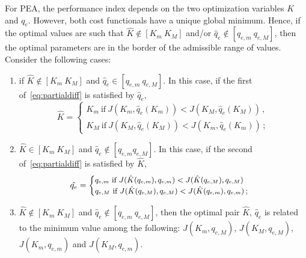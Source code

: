 For PEA, the performance index depends on the two optimization variables $K$ and $q_e$. However, both cost functionals have a unique global minimum. Hence, if the optimal values are such that $\hat{K} \notin [K_m\ K_M]$ and/or $\hat{q}_e \notin [q_{e,m}\ q_{e,M}]$, then the optimal parameters are in the border of the admissible range of values. Consider the following cases:
\begin{enumerate}
\item if $\hat{K} \notin [K_m\ K_M]$ and $\hat{q}_e \in [q_{e,m}\ q_{e,M}]$. In this case, if the first of~\eqref{eq:partialdiff} is satisfied by $\hat{q}_e$, 
\begin{equation*}
\hat{K} = 
\begin{cases} 
K_m \ \text{if} \ J(K_m, \hat{q}_e(K_m))< J(K_M,  \hat{q}_e(K_M))\,, \\
K_M \ \text{if} \ J(K_M, \hat{q}_e(K_M))< J(K_m,  \hat{q}_e(K_m))\,;
\end{cases}
\label{eq:KboundsPEA}
\end{equation*}
\item $\hat{K} \in [K_m\  K_M]$ and $\hat{q}_e \notin [q_{e,m} q_{e,M}]$. In this case, if the second of~\eqref{eq:partialdiff} is satisfied by $\hat{K}$,
\begin{equation*}
\hat{q_e} = 
{\small
\begin{cases} 
q_{e,m} \ \text{if} \ J(\hat{K}(q_{e,m}), q_{e,m})< J(\hat{K}(q_{e,M}), q_{e,M}) \\
q_{e,M} \ \text{if} \ J(\hat{K}(q_{e,M}), q_{e,M})< J(\hat{K}(q_{e,m}), q_{e,m}) \,;
\end{cases}}
\end{equation*}
\item $\hat{K} \notin [K_m\ K_M]$ and $\hat{q}_e \notin [q_{e,m}\ q_{e,M}]$, then the optimal pair $\hat K,\,\hat q_e$ is related to the minimum value among the following: $J(K_m, q_{e,M})$, $J(K_M, q_{e,M})$, $J(K_m, q_{e,m})$ and $J(K_M, q_{e,m})$.
% 
% 


\end{enumerate}
